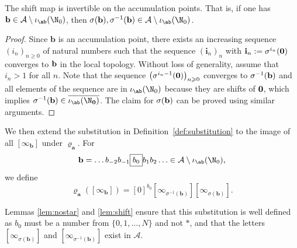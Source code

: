 \begin{lem}\label{lem:shift}
The shift map is invertible on the accumulation points. 
That is, if one has $\mathbf b\in \mathcal{A}\setminus \iota_{\ab}(\N_0)$, then $\sigma(\mathbf{b}),\sigma^{-1}(\mathbf{b})\in \mathcal{A}\setminus \iota_{\ab}(\N_0)$. 
\end{lem}

\begin{proof}
Since $\mathbf b$ is an accumulation point, there exists an increasing sequence $(i_n)_{n\geqslant 0}$ of natural numbers such that the sequence $(\mathbf{i}_n)_n$ with ${\bf i}_n:=\sigma^{i_n}({\bf 0})$ converges to $\bf{b}$ in the local topology. Without loss of generality, assume that $i_n>1$ for all $n$. Note that the sequence $\left(\sigma^{i_n-1}(\bf{0})\right)_{n\geqslant 0}$ converges to $\sigma^{-1}(\bf{b})$ and all elements of the sequence are in $\iota_{\ab}(\N_0)$ because they are shifts of $\bf{0}$, which implies $\sigma^{-1}(\bf{b})\in \overline{\iota_{\ab}(\N_0)}$. The claim for $\sigma({\bf{b}})$ can be proved using similar arguments. 
\end{proof}


We then extend the substitution in Definition~\ref{def:substitution} to the image of  all $[\infty_\mathbf b]$ under $\varrho^{ }_\mathbf a$. 
For $$\mathbf b=\ldots b_{-2}b_{-1}\fbox{$b_0$}b_1b_2\ldots \in \mathcal{A}\setminus \iota_{\ab}(\N_0),$$ 
we define
\begin{equation}\label{eq:subs-extend}
\varrho^{ }_\mathbf a([\infty_\mathbf b])=[0]^{b_0}[\infty^{ }_{\sigma^{-1}(\mathbf b)}][\infty^{ }_{\sigma(\mathbf b)}].
\end{equation}
%

Lemmas \ref{lem:nostar} and \ref{lem:shift} ensure that this substitution is well defined as $b_0$ must be a number from $\{0, 1,\ldots,N\}$ and not $*$, and that the letters $[\infty^{ }_{\sigma(\mathbf b)}]$ and $[\infty^{ }_{\sigma^{-1}(\mathbf b)}]$ exist in $\mathcal{A}$.


%


